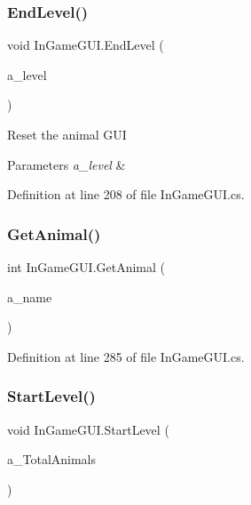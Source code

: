 \subsubsection{\texorpdfstring{End\+Level()}{EndLevel()}}
{\footnotesize\ttfamily void In\+Game\+G\+U\+I.\+End\+Level (\begin{DoxyParamCaption}\item[{string}]{a\+\_\+level }\end{DoxyParamCaption})}



Reset the animal G\+UI 


\begin{DoxyParams}{Parameters}
{\em a\+\_\+level} & \\
\hline
\end{DoxyParams}


Definition at line 208 of file In\+Game\+G\+U\+I.\+cs.

\mbox{\label{class_in_game_g_u_i_a83d88a7dd3b94adc2c555f077c852ec6}} 
\subsubsection{\texorpdfstring{Get\+Animal()}{GetAnimal()}}
{\footnotesize\ttfamily int In\+Game\+G\+U\+I.\+Get\+Animal (\begin{DoxyParamCaption}\item[{\mbox{\hyperlink{_animal_8cs_a2fa5713399b84d1b88dae9196837af50}{A\+N\+I\+M\+A\+L\+\_\+\+N\+A\+ME}}}]{a\+\_\+name }\end{DoxyParamCaption})}



Definition at line 285 of file In\+Game\+G\+U\+I.\+cs.

\mbox{\label{class_in_game_g_u_i_a5b30adb22055f2da74973810a04e10e7}} 
\subsubsection{\texorpdfstring{Start\+Level()}{StartLevel()}}
{\footnotesize\ttfamily void In\+Game\+G\+U\+I.\+Start\+Level (\begin{DoxyParamCaption}\item[{int}]{a\+\_\+\+Total\+Animals }\end{DoxyParamCaption})}



